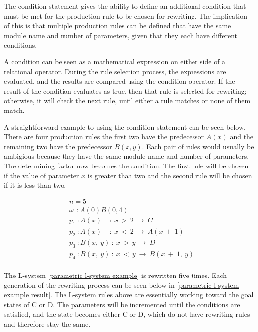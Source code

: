 The condition statement gives the ability to define an additional condition that must be met for the production rule to be chosen for rewriting. The implication of this is that multiple production rules can be defined that have the same module name and number of parameters, given that they each have different conditions.

\newpage
\noindent
A condition can be seen as a mathematical expression on either side of a relational operator. During the rule selection process, the expressions are evaluated, and the results are compared using the condition operator. If the result of the condition evaluates as true, then that rule is selected for rewriting; otherwise, it will check the next rule, until either a rule matches or none of them match. 

A straightforward example to using the condition statement can be seen below. There are four production rules the first two have the predecessor $A(x)$ and the remaining two have the predecessor $B(x, y)$. Each pair of rules would usually be ambigious because they have the same module name and number of parameters. The determining factor now becomes the condition. The first rule will be chosen if the value of parameter $x$ is greater than two and the second rule will be chosen if it is less than two.

\begin{singlespace}
\begin{equation} \label{parametric l-system example}
\begin{aligned}
	&n=5 \\
	&\omega~~ : A(0)B(0,4)\\
	&p_1~ :  A(x)~~~~~ :~ x~ >~ 2~ \rightarrow~ C\\
	&p_2~ :  A(x)~~~~~ :~ x~ <~ 2~ \rightarrow~ A(x~ +~ 1)\\
	&p_3~ :  B(x,~ y)~ :~ x~ >~ y~ \rightarrow~ D\\
	&p_4~ :  B(x,~ y)~ :~ x~ <~ y~ \rightarrow~ B(x~ +~ 1,~ y)\\
\end{aligned}
\end{equation}
\end{singlespace}

\vspace{5mm}
\noindent
The L-system \ref{parametric l-system example} is rewritten five times. Each generation of the rewriting process can be seen below in \ref{parametric l-system example result}. The L-system rules above are essentially working toward the goal states of C or D. The parameters will be incremented until the conditions are satisfied, and the state becomes either C or D, which do not have rewriting rules and therefore stay the same.

